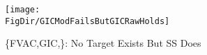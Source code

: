 \begin{figure}[tbp]
\centerline{\texttt{[image: \\FigDir/GICModFailsButGICRawHolds]}}
\caption{\{{FVAC},{GIC},\}: No Target Exists But SS Does}
\label{fig:GICModFailsButGICRawHolds}
\end{figure}
